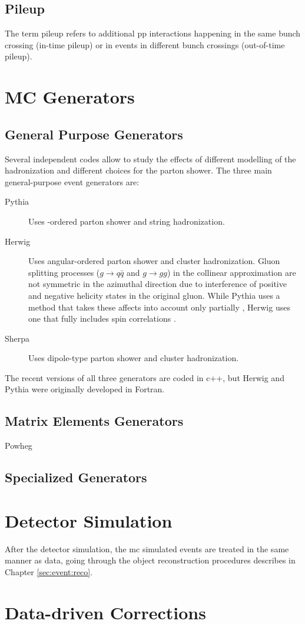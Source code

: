 \subsection{Pileup}

The term pileup refers to additional \gls{pp} interactions happening in the same bunch crossing (in-time pileup) or in events in different bunch crossings (out-of-time pileup). 

\section{MC Generators}

\subsection{General Purpose Generators}

Several independent codes allow to study the effects of different modelling of the hadronization and different choices for the parton shower. The three main general-purpose event generators are:

\begin{description}
\item[Pythia] \cite{Sjostrand:2006za,Sjostrand:2014zea} Uses \pt-ordered parton shower and string hadronization.
\item[Herwig] \cite{Corcella:2000bw,Bahr:2008pv,Bellm:2015jjp} Uses angular-ordered parton shower and cluster hadronization. Gluon splitting processes ($g \rightarrow q\bar{q}$ and $g \rightarrow gg$) in the collinear approximation are not symmetric in the azimuthal direction due to interference of positive and negative helicity states in the original gluon. While Pythia uses a method that takes these affects into account only partially \cite{Webber:1987uy}, Herwig uses one that fully includes spin correlations \cite{Collins:1987cp}. 
\item[Sherpa] \cite{Gleisberg:2008ta} Uses dipole-type parton shower and cluster hadronization. 
\end{description}

The recent versions of all three generators are coded in c++, but Herwig and Pythia were originally developed in Fortran.  

\subsection{Matrix Elements Generators}
\begin{description}
\item[Powheg] 
\end{description}

\subsection{Specialized Generators}


\section{Detector Simulation}

After the detector simulation, the \gls{mc} simulated events are treated in the same manner as data, going through the object reconstruction procedures
describes in Chapter \ref{sec:event:reco}.

\section{Data-driven Corrections}

